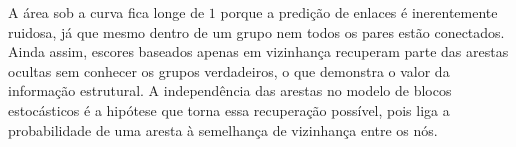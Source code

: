 A área sob a curva fica longe de $1$ porque a predição de enlaces é inerentemente
ruidosa, já que mesmo dentro de um grupo nem todos os pares estão conectados. Ainda
assim, escores baseados apenas em vizinhança recuperam parte das arestas ocultas sem
conhecer os grupos verdadeiros, o que demonstra o valor da informação estrutural. A
independência das arestas no modelo de blocos estocásticos é a hipótese que torna
essa recuperação possível, pois liga a probabilidade de uma aresta à semelhança de
vizinhança entre os nós.

